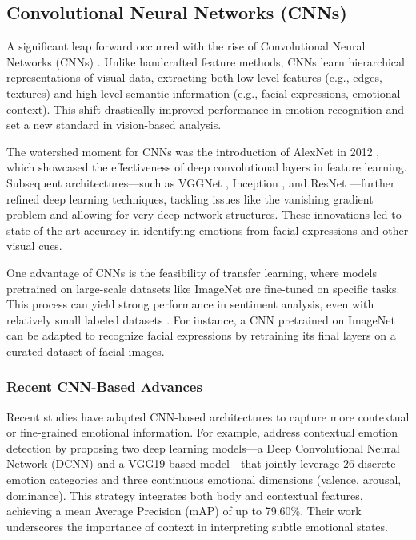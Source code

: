 \subsection*{Convolutional Neural Networks (CNNs)}

A significant leap forward occurred with the rise of Convolutional Neural Networks (CNNs) \cite{lecun_deep_2015}. Unlike handcrafted feature methods, CNNs learn hierarchical representations of visual data, extracting both low-level features (e.g., edges, textures) and high-level semantic information (e.g., facial expressions, emotional context). This shift drastically improved performance in emotion recognition and set a new standard in vision-based analysis.
\newline

The watershed moment for CNNs was the introduction of AlexNet in 2012 \cite{10.5555/2999134.2999257}, which showcased the effectiveness of deep convolutional layers in feature learning. Subsequent architectures—such as VGGNet \cite{simonyan2015deepconvolutionalnetworkslargescale}, Inception \cite{szegedy2015rethinkinginceptionarchitecturecomputer}, and ResNet \cite{he2015deepresiduallearningimage}—further refined deep learning techniques, tackling issues like the vanishing gradient problem and allowing for very deep network structures. These innovations led to state-of-the-art accuracy in identifying emotions from facial expressions and other visual cues.
\newline

One advantage of CNNs is the feasibility of transfer learning, where models pretrained on large-scale datasets like ImageNet \cite{5206848} are fine-tuned on specific tasks. This process can yield strong performance in sentiment analysis, even with relatively small labeled datasets \cite{yosinski2014transferablefeaturesdeepneural}. For instance, a CNN pretrained on ImageNet can be adapted to recognize facial expressions by retraining its final layers on a curated dataset of facial images.

\subsubsection*{Recent CNN-Based Advances}
Recent studies have adapted CNN-based architectures to capture more contextual or fine-grained emotional information. For example, \citet{limami_contextual_2024} address contextual emotion detection by proposing two deep learning models—a Deep Convolutional Neural Network (DCNN) and a VGG19-based model—that jointly leverage 26 discrete emotion categories and three continuous emotional dimensions (valence, arousal, dominance). This strategy integrates both body and contextual features, achieving a mean Average Precision (mAP) of up to 79.60\%. Their work underscores the importance of context in interpreting subtle emotional states.
\newline

